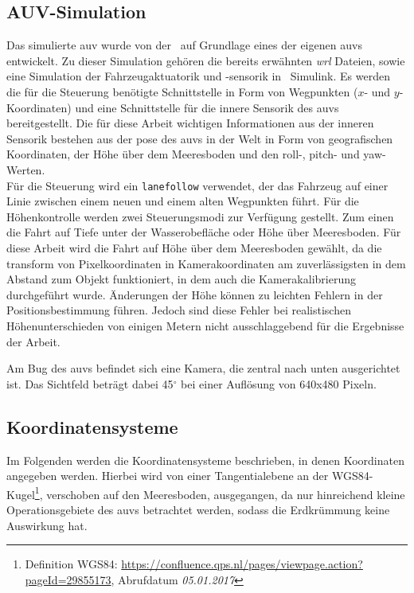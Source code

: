 \subsection{AUV-Simulation}
\label{sec_auvSimGrundlage}
Das simulierte \gls{auv} wurde von der \atlas\ auf Grundlage eines der eigenen \gls{auv}s entwickelt. Zu dieser Simulation gehören die bereits erwähnten \textit{wrl} Dateien, sowie eine Simulation der Fahrzeugaktuatorik und -sensorik in \matlab\ Simulink. Es werden die für die Steuerung benötigte Schnittstelle in Form von Wegpunkten ($x$- und $y$-Koordinaten) und eine Schnittstelle für die innere Sensorik des \gls{auv}s bereitgestellt. Die für diese Arbeit wichtigen Informationen aus der inneren Sensorik bestehen aus der \gls{pose} des \gls{auv}s in der Welt in Form von geografischen Koordinaten, der Höhe über dem Meeresboden und den \gls{roll}-, \gls{pitch}- und \gls{yaw}-Werten.\\
Für die Steuerung wird ein \texttt{\gls{lanefollow}} verwendet, der das Fahrzeug auf einer Linie zwischen einem neuen und einem alten Wegpunkten führt. Für die Höhenkontrolle werden zwei Steuerungsmodi zur Verfügung gestellt. Zum einen die Fahrt auf Tiefe unter der Wasserobefläche oder Höhe über Meeresboden. Für diese Arbeit wird die Fahrt auf Höhe über dem Meeresboden gewählt, da die \gls{transform} von Pixelkoordinaten in Kamerakoordinaten am zuverlässigsten in dem Abstand zum Objekt funktioniert, in dem auch die Kamerakalibrierung durchgeführt wurde. Änderungen der Höhe können zu leichten Fehlern in der Positionsbestimmung führen. Jedoch sind diese Fehler bei realistischen Höhenunterschieden von einigen Metern nicht ausschlaggebend für die Ergebnisse der Arbeit.

Am Bug des \gls{auv}s befindet sich eine Kamera, die zentral nach unten ausgerichtet ist. Das Sichtfeld beträgt dabei 45$^\circ$ bei einer Auflösung von 640x480 Pixeln.
\subsection{Koordinatensysteme}
\label{sec_coordsystems}
Im Folgenden werden die Koordinatensysteme beschrieben, in denen Koordinaten angegeben werden. Hierbei wird von einer Tangentialebene an der WGS84-Kugel\footnote{Definition WGS84: \href{https://confluence.qps.nl/pages/viewpage.action?pageId=29855173}{https://confluence.qps.nl/pages/viewpage.action?pageId=29855173}, Abrufdatum \textit{05.01.2017}}, verschoben auf den Meeresboden, ausgegangen, da nur hinreichend kleine Operationsgebiete des \gls{auv}s betrachtet werden, sodass die Erdkrümmung keine Auswirkung hat.

